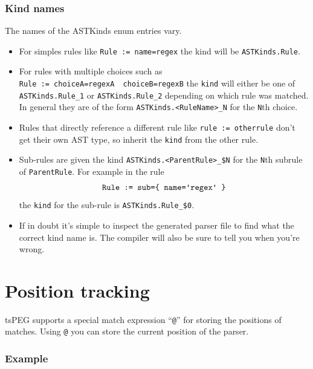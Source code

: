 \subsubsection{Kind names}\label{kind-names}

The names of the ASTKinds enum entries vary.

\begin{itemize}
\item
  For simples rules like
  \texttt{Rule\ :=\ name=\textquotesingle{}regex\textquotesingle{}} the
  kind will be \texttt{ASTKinds.Rule}.
\item
  For rules with multiple choices such as
  \texttt{Rule\ :=\ choiceA=\textquotesingle{}regexA\textquotesingle{}\ \textbar{}\ choiceB=\textquotesingle{}regexB\textquotesingle{}}
  the \texttt{kind} will either be one of \texttt{ASTKinds.Rule\_1} or
  \texttt{ASTKinds.Rule\_2} depending on which rule was matched. In
  general they are of the form
  \texttt{ASTKinds.\textless{}RuleName\textgreater{}\_N} for the
  \texttt{N}th choice.
\item
  Rules that directly reference a different rule like
  \texttt{rule\ :=\ otherrule} don't get their own AST type, so inherit
  the \texttt{kind} from the other rule.
\item
  Sub-rules are given the kind
  \texttt{ASTKinds.\textless{}ParentRule\textgreater{}\_\$N} for the
  \texttt{N}th subrule of \texttt{ParentRule}. For example in the
  rule
    \[\texttt{Rule\ :=\ sub=\{\ name=\textquotesingle{}regex\textquotesingle{}\ \}}\]
  the \texttt{kind} for the sub-rule is \texttt{ASTKinds.Rule\_\$0}.
\item
  If in doubt it's simple to inspect the generated parser file to find
  what the correct kind name is. The compiler will also be sure to tell
  you when you're wrong.
\end{itemize}

\section{Position tracking}\label{position-tracking}

tsPEG supports a special match expression ``\texttt{@}'' for storing the
positions of matches. Using \texttt{@} you can store the current
position of the parser.

\subsubsection{Example}\label{example-1}

